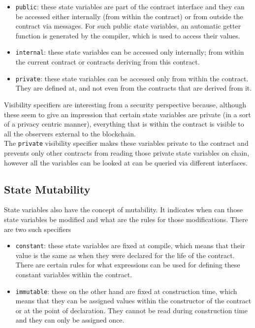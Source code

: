 \begin{itemize}

   \item\texttt{public}: these state variables are part of the contract interface and they can be accessed either internally (from within the contract) or from outside the contract via messages.
   For such public state variables, an automatic getter function is generated by the compiler, which is used to access their values.

   \item\texttt{internal}: these state variables can be accessed only internally; from within the current contract or contracts deriving from this contract.

   \item\texttt{private}: these state variables can be accessed only from within the contract.
   They are defined at, and not even from the contracts that are derived from it.

\end{itemize}

Visibility specifiers are interesting from a security perspective because, although these seem to give an impression that certain state variables are private (in a sort of a privacy centric manner), everything that is within the contract is visible to all the observers external to the blockchain.\\

The \texttt{private} visibility specifier makes these variables private to the contract and prevents only other contracts from reading those private state variables on chain, however all the variables can be looked at can be queried via different interfaces.

\subsection*{State Mutability}

State variables also have the concept of mutability.
It indicates when can those state variables be modified and what are the rules for those modifications.
There are two such specifiers

\begin{itemize}

   \item\texttt{constant}: these state variables are fixed at compile, which means that their value is the same as when they were declared for the life of the contract. 
   There are certain rules for what expressions can be used for defining these constant variables within the contract.

   \item\texttt{immutable}: these on the other hand are fixed at construction time, which means that they can be assigned values within the constructor of the contract or at the point of declaration.
   They cannot be read during construction time and they can only be assigned once.

\end{itemize}

